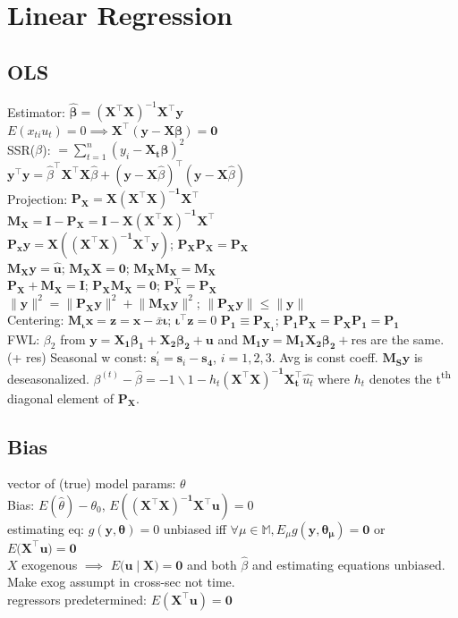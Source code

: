 \section{Linear Regression}
\subsection*{OLS}
Estimator: $\hat{\mathbf{\beta}} = (\mathbf{X}^{\top}\mathbf{X})^{-1}\mathbf{X}^{\top}\mathbf{y}$\\
$E(x_{ti}u_t) = 0 \implies \mathbf{X}^{\top}(\mathbf{y}-\mathbf{X}\mathbf{\beta}) = \mathbf{0}$\\
SSR($\beta$): $= \sum_{t=1}^{n}(y_i - \mathbf{X_t}\mathbf{\beta})^2$\\
$\mathbf{y}^{\top} \mathbf{y} = \hat{\beta}^{\top} \mathbf{X}^{\top}\mathbf{X}\hat{\beta} + (\mathbf{y} - \mathbf{X}\hat{\beta} )^{\top} (\mathbf{y} - \mathbf{X}\hat{\beta})$\\
Projection: $\mathbf{P_X = X(X^{\top} X)^{-1} X^{\top}}$\\
$\mathbf{M_X = I- P_X = I - X(X^{\top} X)^{-1} X^{\top}}$\\
$\mathbf{P_x y = X((X^{\top}X)^{-1}X^{\top}y)}$; $\mathbf{P_X P_X = P_X}$\\
$\mathbf{M_X y = \hat{u}}$; $\mathbf{M_X X = 0}$; $\mathbf{M_X M_X = M_X}$\\
$\mathbf{P_X + M_X = I}$; $\mathbf{P_X M_X} = \mathbf{0}$; $\mathbf{P_X ^{\top} = P_X}$\\
$\lVert \mathbf{y} \rVert ^2 = \lVert \mathbf{P_X y} \rVert ^2 + \lVert \mathbf{M_X y} \rVert ^2$; $\lVert \mathbf{P_X y \rVert \leq \lVert \mathbf{y} \rVert}$\\
Centering: $\mathbf{M_{\iota}x = z = x} - \bar{x}\mathbf{\iota}$; $\mathbf{\iota^{\top} z} = 0$
$\mathbf{P_1 \equiv P_{X_1}}$; $\mathbf{P_1 P_X = P_X P_1 = P_1}$\\
FWL: $\beta_2$ from $\mathbf{y = X_1\beta_1 +X_2 \beta_2 + u}$ and $\mathbf{M_1 y = M_1 X_2 \beta_2} + \text{res}$  are the same. (+ res)
Seasonal w const: $\mathbf{s}_i ^{\prime} = \mathbf{s}_i - \mathbf{s_4}$, $i=1,2,3$.
Avg is const coeff.
$\mathbf{M_{S}y}$ is deseasonalized.
$\beta^{(t)}-\hat{\beta} = -1 \backslash 1-h_t \mathbf{(X^{\top}X)^{-1}X_t ^{\top}}\hat{u_t}$ where $h_t$ denotes the t\textsuperscript{th} diagonal element of $\mathbf{P_X}$.
\subsection*{Bias}
vector of (true) model params: $\theta$\\
Bias: $E(\hat{\theta}) - \theta_0$, $E(\mathbf{(X^{\top}X)^{-1}X^{\top}u}) = 0$\\
estimating eq: $g(\mathbf{y},\mathbf{\theta}) = 0$ unbiased iff $\forall \mu \in \mathbb{M}, E_{\mu}g(\mathbf{y,\theta_\mu}) = \mathbf{0}$ or $E(\mathbf{X^{\top}u) = 0}$\\
$X$ exogenous $\implies$ $E(\mathbf{u \mid X) = 0}$ and both  $\hat{\beta}$ and estimating equations unbiased.\\
Make exog assumpt in cross-sec not time.\\
regressors predetermined: $E(\mathbf{X^{\top}u}) = \mathbf{0}$
